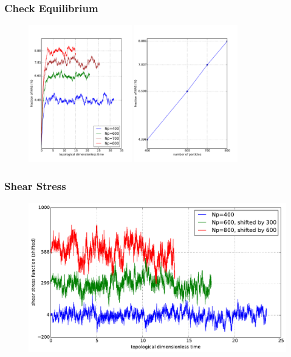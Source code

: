 \documentclass[slidestop, compress, mathserif]{beamer}
\begin{document}
\begin{frame}
  \frametitle<presentation>{Check Equilibrium}
  \begin{figure}
    \centering
    \includegraphics[width=0.4\textwidth]{../check_equilibrium_refined.pdf}
    \includegraphics[width=0.4\textwidth]{../check_fNAS.pdf}
    
  \end{figure}
\end{frame}

\begin{frame}
  \frametitle<presentation>{Shear Stress}
  \begin{figure}
    \centering
    \includegraphics[width=\textwidth]{../check_shear_stress.pdf}
  \end{figure}
\end{frame}
\end{document}
